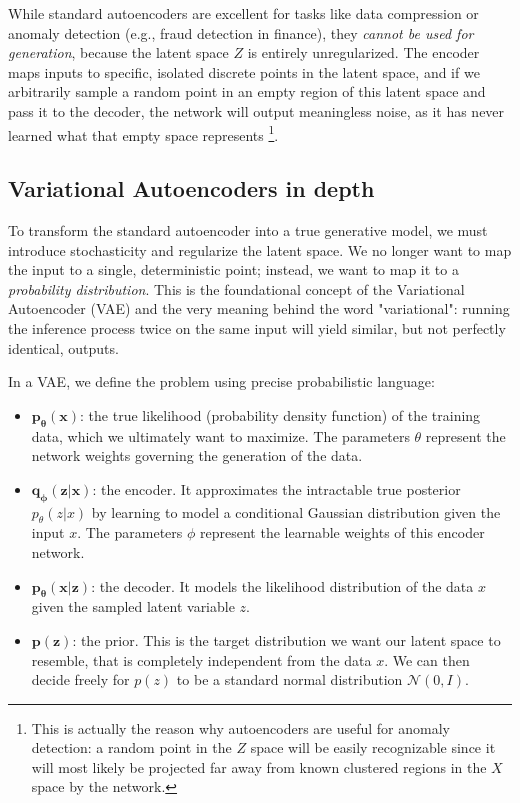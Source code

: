 While standard autoencoders are excellent for tasks like data compression or anomaly detection (e.g., fraud detection in finance), they \textit{cannot be used for generation}, because the latent space $Z$ is entirely unregularized. The encoder maps inputs to specific, isolated discrete points in the latent space, and if we arbitrarily sample a random point in an empty region of this latent space and pass it to the decoder, the network will output meaningless noise, as it has never learned what that empty space represents \footnote{This is actually the reason why autoencoders are useful for anomaly detection: a random point in the $Z$ space will be easily recognizable since it will most likely be projected far away from known clustered regions in the $X$ space by the network.}. 

\subsection{Variational Autoencoders in depth}

To transform the standard autoencoder into a true generative model, we must introduce stochasticity and regularize the latent space. We no longer want to map the input to a single, deterministic point; instead, we want to map it to a \textit{probability distribution}. This is the foundational concept of the Variational Autoencoder (VAE) and the very meaning behind the word "variational": running the inference process twice on the same input will yield similar, but not perfectly identical, outputs.

In a VAE, we define the problem using precise probabilistic language:
\begin{itemize}
    \item[-] $\mathbf{p_\theta(x)}$: the true likelihood (probability density function) of the training data, which we ultimately want to maximize. The parameters $\theta$ represent the network weights governing the generation of the data.
    \item[-] $\mathbf{q_\phi(z|x)}$: the encoder. It approximates the intractable true posterior $p_\theta(z|x)$ by learning to model a conditional Gaussian distribution given the input $x$. The parameters $\phi$ represent the learnable weights of this encoder network.
    \item[-] $\mathbf{p_\theta(x|z)}$: the decoder. It models the likelihood distribution of the data $x$ given the sampled latent variable $z$. 
    \item[-] $\mathbf{p(z)}$: the prior. This is the target distribution we want our latent space to resemble, that is completely independent from the data $x$. We can then decide freely for $p(z)$ to be a standard normal distribution $\mathcal{N}(0, I)$.
\end{itemize}

